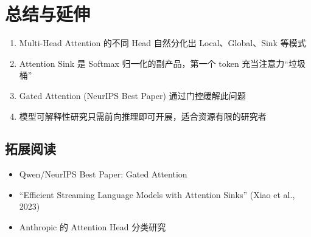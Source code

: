 \section{总结与延伸}

\begin{enumerate}
  \item Multi-Head Attention 的不同 Head 自然分化出 Local、Global、Sink 等模式
  \item Attention Sink 是 Softmax 归一化的副产品，第一个 token 充当注意力``垃圾桶''
  \item Gated Attention (NeurIPS Best Paper) 通过门控缓解此问题
  \item 模型可解释性研究只需前向推理即可开展，适合资源有限的研究者
\end{enumerate}

\subsection{拓展阅读}
\begin{itemize}
  \item Qwen/NeurIPS Best Paper: Gated Attention
  \item ``Efficient Streaming Language Models with Attention Sinks'' (Xiao et al., 2023)
  \item Anthropic 的 Attention Head 分类研究
\end{itemize}


